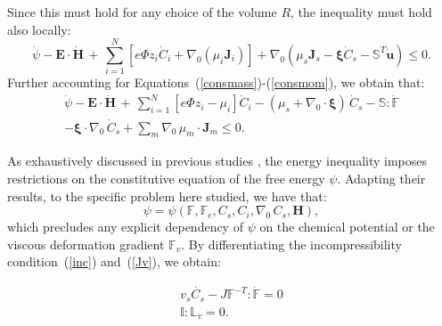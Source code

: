 \documentclass[runningheads]{llncs}
\newcommand{\F}{\ensuremath{\mathbb{F}}}
\newcommand{\LL}{\ensuremath{\mathbb{L}}}
\begin{document}
Since this must hold for any choice of the volume $R$, the inequality must hold also locally:
\begin{equation}
\dot{\psi} - \mathbf{E}\cdot \dot{\mathbf{H}} \, + \, \sum\limits_{i=1}^{N} \left[e \Phi  z_i \dot{C}_i+ \nabla_0 \left(\mu_i \mathbf{J}_i \right)\right] + \nabla_0 (\mu_s \mathbf{J}_s- \boldsymbol{\xi}\dot{C}_s -\mathbb{S}^T\mathbf{\dot{u}}) \leq 0. 
\end{equation}
Further accounting for Equations~(\ref{consmass})-(\ref{consmom}), we obtain that:
\begin{equation}
\begin{aligned}
\dot{\psi} - \mathbf{E}\cdot \dot{\mathbf{H}} \, + \, \sum\limits_{i=1}^{N} \left[e \Phi  z_i - \mu_i\right] \dot{C}_i - (\mu_s + \nabla_0 \cdot \boldsymbol{\xi})\,\dot{C}_s -\mathbb{S}:\dot{\F}\\
-\boldsymbol{\xi} \cdot \nabla_0 \, \dot{C}_s + \sum\limits_{m} \nabla_0 \, \mu_m \cdot \mathbf{J}_m \leq 0.
\label{temp2}
\end{aligned} 
\end{equation}

As exhaustively discussed in previous studies \cite{Plasto,GURTIN}, the energy inequality imposes restrictions on the constitutive equation of the free energy $\psi$. Adapting their results, to the specific problem here studied, we have that:
\begin{equation}
\psi = \psi (\F,\F_e, C_s, C_i, \nabla_0 \,C_s,\mathbf{H}), \label{temp1}
\end{equation}
which precludes any explicit dependency of $\psi$ on the chemical potential or the viscous deformation gradient $\F_v$. By differentiating the incompressibility condition~(\ref{inc}) and~(\ref{Jv}), we obtain:

\begin{gather}
v_s\dot{C_s} - J \F^{-T}:\dot{\F} =0 \label{temp3}\\
\mathbb{I}:\LL_v=0. \label{temp4}
\end{gather}
\end{document}
